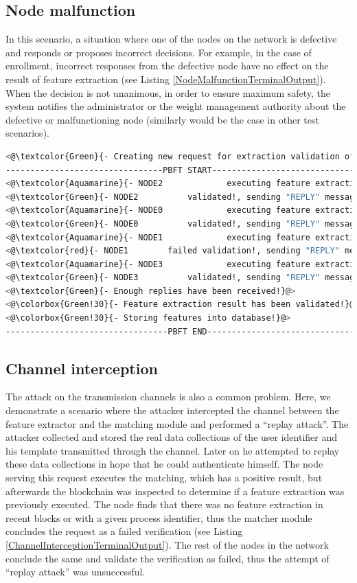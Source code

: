 \subsection{Node malfunction}
\label{Node malfunction}
In this scenario, a situation where one of the nodes on the network is defective and responds or proposes incorrect decisions. For example, in the case of enrollment, incorrect responses from the defective node have no effect on the result of feature extraction (see Listing \ref{NodeMalfunctionTerminalOutput}). When the decision is not unanimous, in order to ensure maximum safety, the system notifies the administrator or the weight management authority about the defective or malfunctioning node (similarly would be the case in other test scenarios).
\begin{lstlisting}[language=bash,frame=single,breaklines={false}, caption={Terminal output for enrollment with one malfunctioning node.},captionpos=b, label={NodeMalfunctionTerminalOutput}]
<@\textcolor{Green}{- Creating new request for extraction validation of SUCCESS enrollment!}@>
--------------------------------PBFT START---------------------------------
<@\textcolor{Aquamarine}{- NODE2			 executing feature extraction}@>
<@\textcolor{Green}{- NODE2 		 validated!, sending "REPLY" message!}@>
<@\textcolor{Aquamarine}{- NODE0			 executing feature extraction}@>
<@\textcolor{Green}{- NODE0 		 validated!, sending "REPLY" message!}@>
<@\textcolor{Aquamarine}{- NODE1			 executing feature extraction}@>
<@\textcolor{red}{- NODE1 		 failed validation!, sending "REPLY" message!}@>
<@\textcolor{Aquamarine}{- NODE3			 executing feature extraction}@>
<@\textcolor{Green}{- NODE3 		 validated!, sending "REPLY" message!}@>
<@\textcolor{Green}{- Enough replies have been received!}@>
<@\colorbox{Green!30}{- Feature extraction result has been validated!}@>
<@\colorbox{Green!30}{- Storing features into database!}@>
---------------------------------PBFT END----------------------------------
\end{lstlisting}

\subsection{Channel interception}
\label{Channel interception}
The attack on the transmission channels is also a common problem. Here, we demonstrate a scenario where the attacker intercepted the channel between the feature extractor and the matching module and performed a ``replay attack''. The attacker collected and stored the real data collections of the user identifier and his template transmitted through the channel. Later on he attempted to replay these data collections in hope that he could authenticate himself. The node serving this request executes the matching, which has a positive result, but afterwards the blockchain was inspected to determine if a feature extraction was previously executed. The node finds that there was no feature extraction in recent blocks or with a given process identifier, thus the matcher module concludes the request as a failed verification (see Listing \ref{ChannelInterceptionTerminalOutput}). The rest of the nodes in the network conclude the same and validate the verification as failed, thus the attempt of ``replay attack'' was unsuccessful.

